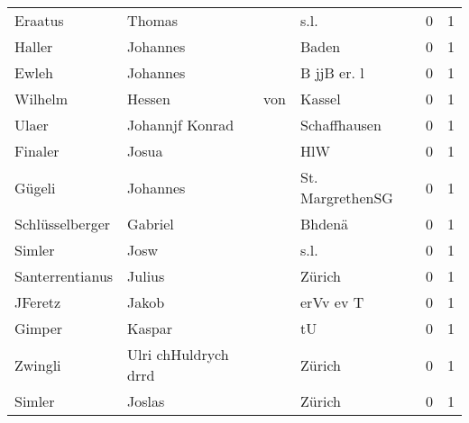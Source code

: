 \begin{tabular}{llllrr}
                  Eraatus &                             Thomas &             &                                        s.l. &          0 &         1 \\
                   Haller &                           Johannes &             &                                       Baden &          0 &         1 \\
                    Ewleh &                           Johannes &             &                                 B jjB er. l &          0 &         1 \\
                  Wilhelm &                             Hessen &         von &                                      Kassel &          0 &         1 \\
                    Ulaer &                    Johannjf Konrad &             &                                Schaffhausen &          0 &         1 \\
                  Finaler &                              Josua &             &                                         HlW &          0 &         1 \\
                   Gügeli &                           Johannes &             &                            St. MargrethenSG &          0 &         1 \\
          Schlüsselberger &                            Gabriel &             &                                      Bhdenä &          0 &         1 \\
                   Simler &                               Josw &             &                                        s.l. &          0 &         1 \\
          Santerrentianus &                             Julius &             &                                      Zürich &          0 &         1 \\
                  JFeretz &                              Jakob &             &                                   erVv ev T &          0 &         1 \\
                   Gimper &                             Kaspar &             &                                          tU &          0 &         1 \\
                  Zwingli &               Ulri chHuldrych drrd &             &                                      Zürich &          0 &         1 \\
                   Simler &                             Joslas &             &                                      Zürich &          0 &         1 \\

\end{tabular}
